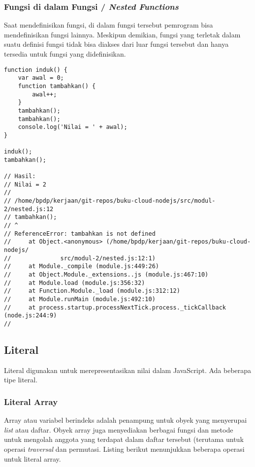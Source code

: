 \subsubsection{Fungsi di dalam Fungsi / \textit{Nested Functions}}

Saat mendefinisikan fungsi, di dalam fungsi tersebut pemrogram bisa mendefinisikan fungsi lainnya. Meskipun demikian, fungsi yang terletak dalam suatu definisi fungsi tidak bisa diakses dari luar fungsi tersebut dan hanya tersedia untuk fungsi yang didefinisikan.

\lstset{language=JavaScript,caption=Fungsi di dalam Fungsi}
\begin{lstlisting}
function induk() {
	var awal = 0;
	function tambahkan() {
		awal++;
	}
	tambahkan();
	tambahkan();
	console.log('Nilai = ' + awal);
}

induk();
tambahkan();

// Hasil:
// Nilai = 2
//
// /home/bpdp/kerjaan/git-repos/buku-cloud-nodejs/src/modul-2/nested.js:12
// tambahkan();
// ^
// ReferenceError: tambahkan is not defined
//     at Object.<anonymous> (/home/bpdp/kerjaan/git-repos/buku-cloud-nodejs/
//				src/modul-2/nested.js:12:1)
//     at Module._compile (module.js:449:26)
//     at Object.Module._extensions..js (module.js:467:10)
//     at Module.load (module.js:356:32)
//     at Function.Module._load (module.js:312:12)
//     at Module.runMain (module.js:492:10)
//     at process.startup.processNextTick.process._tickCallback (node.js:244:9)
//
\end{lstlisting}

\subsection{Literal}

Literal digunakan untuk merepresentasikan nilai dalam JavaScript. Ada beberapa tipe literal.

\subsubsection{Literal Array}

Array atau variabel berindeks adalah penampung untuk obyek yang menyerupai \textit{list} atau daftar. Obyek array juga menyediakan berbagai fungsi dan metode untuk mengolah anggota yang terdapat dalam daftar tersebut (terutama untuk operasi \textit{traversal} dan permutasi. Listing berikut menunjukkan beberapa operasi untuk literal array.

